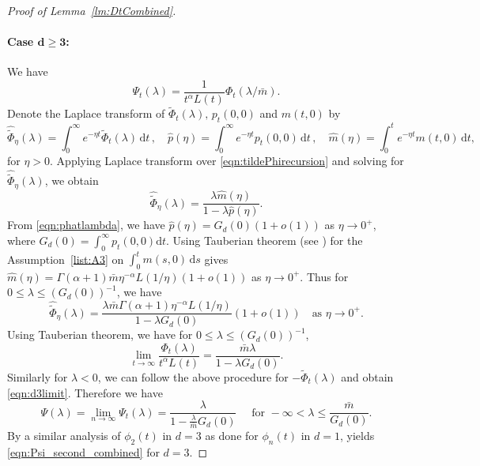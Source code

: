 \documentclass{article}[12pt]
\theoremstyle{definition}
\newcommand{\1}{\mathbbm{1}}
\newcommand{\dd }{\mathrm{d} }
\begin{document}
\begin{proof}[Proof of Lemma~\ref{lm:DtCombined}]
\paragraph{Case $\mathbf{d\ge 3}$:} We have 
$$\Psi_t(\lambda) = \frac{1}{t^\alpha L(t)}\Phi_t(\lambda/\bar{m}).$$
Denote the Laplace transform of $\tilde{\Phi}_t(\lambda), \,p_{t}(0,0) $ and $m(t,0)$ by 
\begin{equation}
    \hat{\tilde{\Phi}}_\eta(\lambda)= \int_0^\infty  e^{-\eta t} \tilde{\Phi}_t(\lambda)\,\dd t\,,\quad \hat{p}(\eta) = \int_0^\infty e^{-\eta t} p_t(0,0)\, \dd t\,, \quad \hat{m}(\eta) = \int_0^t  e^{-\eta t} m(t,0)\, \dd t,
\label{eqn:Laplace}
\end{equation}
for $\eta>0$. Applying Laplace transform over \eqref{eqn:tildePhirecursion}
and solving for $\hat{\tilde{\Phi}}_\eta(\lambda)$, we obtain
\begin{equation}
    \hat{\tilde{\Phi}}_\eta(\lambda) = \frac{\lambda\hat{m}(\eta)}{1-\lambda\hat{p}(\eta)}.
    \label{eqn:tildePhiHatexpression}
\end{equation}
From \eqref{eqn:phatlambda}, we have $\hat{p}(\eta) = G_d(0)(1+o(1))$ as $\eta\to 0^+$, where $G_d(0) = \int_0^\infty p_t(0,0)\dd t$. Using Tauberian theorem (see \cite[Chapter~XIII.5, Theorem~2]{F1971}) for the Assumption~\ref{list:A3} on $\int_0^t m(s,0)\,\dd s$ gives $\hat{m}(\eta) = \Gamma(\alpha +1)\bar{m}\eta^{-\alpha}L(1/\eta)(1+o(1))$ as $\eta \to 0^+$. Thus for $0\le\lambda\le (G_d(0))^{-1}$, we have
$$\hat{\tilde{\Phi}}_\eta(\lambda) = \frac{\lambda \bar{m}\Gamma(\alpha +1)\eta^{-\alpha}L(1/\eta)}{1-\lambda G_d(0)}(1+o(1))\quad \text{as } \eta \to 0^+.$$
Using Tauberian theorem, we have for $0\le\lambda\le (G_d(0))^{-1}$,
\begin{equation}
    \lim_{t\to \infty}\frac{\Phi_t(\lambda)}{t^{\alpha}L(t)} = \frac{\bar{m}\lambda}{1-\lambda G_d(0)}.
    \label{eqn:d3limit}
\end{equation}
Similarly for $\lambda<0$, we can follow the above procedure for $-\tilde{\Phi}_t(\lambda)$ and obtain \eqref{eqn:d3limit}. Therefore we have
$$\Psi(\lambda) = \lim_{n\to \infty}\Psi_t(\lambda) = \frac{\lambda}{1-\frac{\lambda}{\bar{m}} G_d(0)}\quad \text{ for } -\infty< \lambda \le \frac{\bar{m}}{G_d(0)}.$$
By a similar analysis of $\phi_2(t)$ in $d=3$ as done for $\phi_n(t)$ in $d=1$, yields \eqref{eqn:Psi_second_combined} for $d=3$.
\end{proof}
\end{document}
